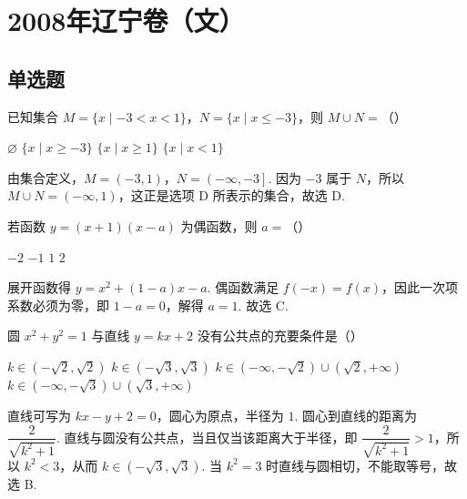 \chapter{2008年辽宁卷（文）}

\section{单选题}

\begin{problem}
已知集合 \(M = \{x \mid -3 < x < 1\}\)，\(N = \{x \mid x \leqslant -3\}\)，则 \(M \cup N =\)（\quad）

\choices
    {\( \varnothing \)}
    {\(\{x\mid x\geqslant -3\}\)}
    {\(\{x\mid x\geqslant 1\}\)}
    {\(\{x\mid x < 1\}\)}

\begin{solution}
由集合定义，\(M=\left(-3,1\right)\)，\(N=\left(-\infty,-3\right]\). 因为 \(-3\) 属于 \(N\)，所以
\(M\cup N=\left(-\infty,1\right)\)，这正是选项 D 所表示的集合，故选 D.
\end{solution}
\end{problem}

\begin{problem}
若函数 \( y = (x + 1)(x - a) \) 为偶函数，则 \( a = \)（\quad）

\choices
    {\(-2\)}
    {\(-1\)}
    {\(1\)}
    {\(2\)}

\begin{solution}
展开函数得 \(y=x^2+(1-a)x-a\). 偶函数满足 \(f(-x)=f(x)\)，因此一次项系数必须为零，即 \(1-a=0\)，解得 \(a=1\). 故选 C.
\end{solution}
\end{problem}

\begin{problem}
圆 \(x^{2} + y^{2} = 1\) 与直线 \(y = kx + 2\) 没有公共点的充要条件是（\quad）

\choices
    {\(k \in (-\sqrt{2}, \sqrt{2})\)}
    {\(k \in (-\sqrt{3}, \sqrt{3})\)}
    {\(k \in (-\infty, -\sqrt{2}) \cup (\sqrt{2}, +\infty)\)}
    {\(k \in (-\infty, -\sqrt{3}) \cup (\sqrt{3}, +\infty)\)}

\begin{solution}
直线可写为 \(kx-y+2=0\)，圆心为原点，半径为 \(1\). 圆心到直线的距离为
\(\dfrac{2}{\sqrt{k^2+1}}\). 直线与圆没有公共点，当且仅当该距离大于半径，即
\(\dfrac{2}{\sqrt{k^2+1}}>1\)，所以 \(k^2<3\)，从而 \(k\in\left(-\sqrt{3},\sqrt{3}\right)\). 当 \(k^2=3\) 时直线与圆相切，不能取等号，故选 B.
\end{solution}
\end{problem}

